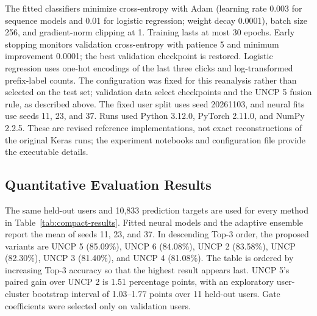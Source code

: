 \documentclass[sn-mathphys-num, Numbered]{sn-jnl}%
\theoremstyle{thmstyleone}%
\theoremstyle{thmstyletwo}%
\theoremstyle{thmstylethree}%
\providecommand{\DIFadd}[1]{{\protect\color{green!40!black}#1}} %
\providecommand{\DIFaddbegin}{} %
\providecommand{\DIFaddend}{} %
\newcommand{\DIFaddincludegraphics}[2][]{{\color{blue}\fbox{\DIFOincludegraphics[#1]{#2}}}} %
\DeclareRobustCommand{\DIFaddbegin}{\DIFOaddbegin \let\includegraphics\DIFaddincludegraphics} %
\DeclareRobustCommand{\DIFaddend}{\DIFOaddend \let\includegraphics\DIFOincludegraphics} %
\begin{document}
\DIFadd{The fitted classifiers minimize cross-entropy with Adam (learning rate 0.003 for sequence models and 0.01 for logistic regression; weight decay 0.0001), batch size 256, and gradient-norm clipping at 1. Training lasts at most 30 epochs. Early stopping monitors validation cross-entropy with patience 5 and minimum improvement 0.0001; the best validation checkpoint is restored. Logistic regression uses one-hot encodings of the last three clicks and log-transformed prefix-label counts. The configuration was fixed for this reanalysis rather than selected on the test set; validation data select checkpoints and the UNCP 5 fusion rule, as described above. The fixed user split uses seed 20261103, and neural fits use seeds 11, 23, and 37. Runs used Python 3.12.0, PyTorch 2.11.0, and NumPy 2.2.5. These are revised reference implementations, not exact reconstructions of the original Keras runs; the experiment notebooks and configuration file provide the executable details.}


\DIFaddend \subsection{Quantitative Evaluation Results}
\DIFaddbegin \DIFadd{The same held-out users and 10,833 prediction targets are used for every method in Table~\ref{tab:compact-results}. Fitted neural models and the adaptive ensemble report the mean of seeds 11, 23, and 37. In descending Top-3 order, the proposed variants are UNCP 5 (85.09\%), UNCP 6 (84.08\%), UNCP 2 (83.58\%), UNCP (82.30\%), UNCP 3 (81.40\%), and UNCP 4 (81.08\%). The table is ordered by increasing Top-3 accuracy so that the highest result appears last. UNCP 5's paired gain over UNCP 2 is 1.51 percentage points, with an exploratory user-cluster bootstrap interval of 1.03--1.77 points over 11 held-out users. Gate coefficients were selected only on validation users.
}

\newcommand{\modeldetail}[1]{{\footnotesize\color{green!35!black}(#1)}}
\newcommand{\score}[2]{#1\,{\color{black!55}\scriptscriptstyle\pm\,#2}}
\newcommand{\uncpbase}{UNCP \modeldetail{GRU--Transformer fusion}}
\newcommand{\uncptwo}{UNCP 2 \modeldetail{transition-graph-aware GRU--Transformer}}
\newcommand{\uncpthree}{UNCP 3 \modeldetail{GRU, Transformer, Mamba-2-inspired SSD}}
\newcommand{\uncpfour}{UNCP 4 \modeldetail{typed graph attention, GRU, transition graph, candidate masking, adaptive fusion}}
\newcommand{\uncpfive}{\textbf{UNCP 5} \modeldetail{UNCP 2, transition model, adaptive fusion}}
\newcommand{\uncpsix}{UNCP 6 \modeldetail{dual GRU streams, run lengths, repeat/switch head}}
\end{document}
